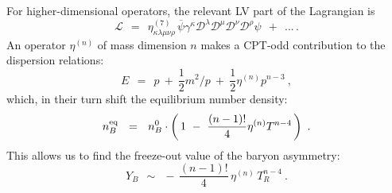 \documentclass[12pt]{revtex4}
\newcommand{\eq}{{\rm eq}}
\newcommand{\mc}[1]{\mathcal{#1}}
\newcommand{\md}{\mathcal{D}}
\newcommand{\ov}{\overline}
\begin{document}
	For higher-dimensional operators, the relevant LV part of the 
	Lagrangian is
\[
	\mc{L} ~~=~~ \eta^{(7)}_{\kappa\lambda\mu\nu\rho}\,
	\ov{\psi} \gamma^\kappa \md^\lambda \md^\mu \md^\nu \md^\rho \psi
	~~+~~ ...\,.
\]
	An operator $ \eta^{(n)} $ of mass dimension $ n $ makes a CPT-odd contribution to
	the dispersion relations:
\begin{equation}
\label{disp_rel_n}
	E ~~=~~ p ~+~ \frac 12 m^2/p ~+~ \frac 12 \eta^{(n)} p^{n-3}~,
\end{equation}
	which, in their turn shift the equilibrium number density:
\[
	n_B^\eq ~~=~~ n_B^0 \cdot \left(\, 1 ~-~ \frac{(n-1)!}{4} \eta^{(n)} T^{n-4}
					\,\right)~.
\]
	This allows us to find the freeze-out value of the baryon asymmetry:
\begin{equation}
\label{Y_B_n}
	Y_B ~~\sim~~ -\, \frac{(n-1)!}{4} \, \eta^{(n)} \,T^{n-4}_R~.
\end{equation}
	
\end{document}
